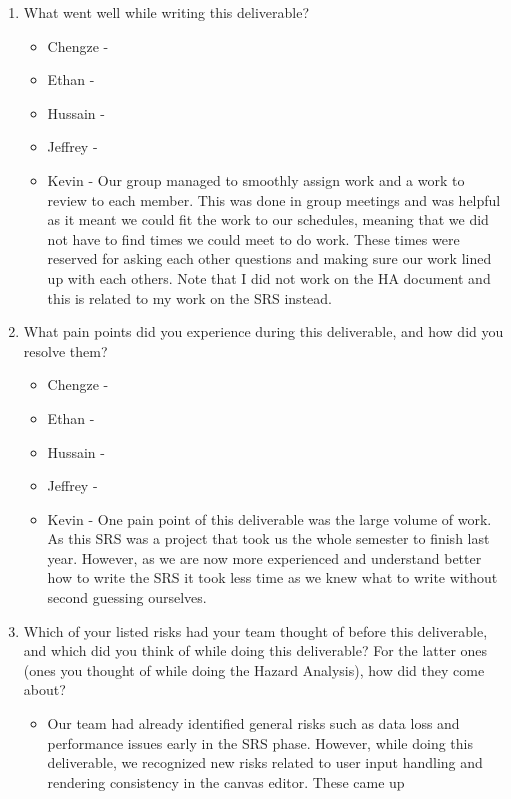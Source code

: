 \documentclass{article}
\begin{document}
\begin{enumerate}
    \item What went well while writing this deliverable? 
    \begin{itemize}
        \item Chengze - 
        \item Ethan - 
        \item Hussain - 
        \item Jeffrey - 
        \item Kevin - Our group managed to smoothly assign work and a work to review to each member. This was done in group meetings and was helpful as it meant we could fit the work to our schedules, meaning that we did not have to find times we could meet to do work. These times were reserved for asking each other questions and making sure our work lined up with each others. Note that I did not work on the HA document and this is related to my work on the SRS instead.  
    \end{itemize} 
    \item What pain points did you experience during this deliverable, and how
    did you resolve them?
    \begin{itemize}
        \item Chengze - 
        \item Ethan - 
        \item Hussain - 
        \item Jeffrey - 
        \item Kevin - One pain point of this deliverable was the large volume of work. As this SRS was a project that took us the whole semester to finish last year. However, as we are now more experienced and understand better how to write the SRS it took less time as we knew what to write without second guessing ourselves.
    \end{itemize} 
    \item Which of your listed risks had your team thought of before this
    deliverable, and which did you think of while doing this deliverable? For
    the latter ones (ones you thought of while doing the Hazard Analysis), how
    did they come about?
    \begin{itemize}
        \item Our team had already identified general risks such as 
        data loss and performance issues early in the SRS phase. However, while 
        doing this deliverable, we recognized new risks related to user input 
        handling and rendering consistency in the canvas editor. These came up 

\end{itemize}
\end{enumerate}
\end{document}
